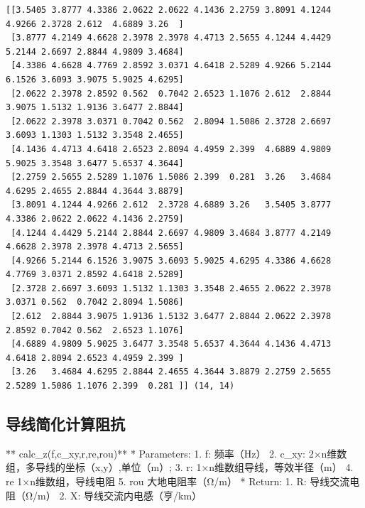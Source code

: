 \documentclass[11pt]{article}
\begin{document}
    \begin{Verbatim}[commandchars=\\\{\}]
[[3.5405 3.8777 4.3386 2.0622 2.0622 4.1436 2.2759 3.8091 4.1244 4.9266 2.3728 2.612  4.6889 3.26  ]
 [3.8777 4.2149 4.6628 2.3978 2.3978 4.4713 2.5655 4.1244 4.4429 5.2144 2.6697 2.8844 4.9809 3.4684]
 [4.3386 4.6628 4.7769 2.8592 3.0371 4.6418 2.5289 4.9266 5.2144 6.1526 3.6093 3.9075 5.9025 4.6295]
 [2.0622 2.3978 2.8592 0.562  0.7042 2.6523 1.1076 2.612  2.8844 3.9075 1.5132 1.9136 3.6477 2.8844]
 [2.0622 2.3978 3.0371 0.7042 0.562  2.8094 1.5086 2.3728 2.6697 3.6093 1.1303 1.5132 3.3548 2.4655]
 [4.1436 4.4713 4.6418 2.6523 2.8094 4.4959 2.399  4.6889 4.9809 5.9025 3.3548 3.6477 5.6537 4.3644]
 [2.2759 2.5655 2.5289 1.1076 1.5086 2.399  0.281  3.26   3.4684 4.6295 2.4655 2.8844 4.3644 3.8879]
 [3.8091 4.1244 4.9266 2.612  2.3728 4.6889 3.26   3.5405 3.8777 4.3386 2.0622 2.0622 4.1436 2.2759]
 [4.1244 4.4429 5.2144 2.8844 2.6697 4.9809 3.4684 3.8777 4.2149 4.6628 2.3978 2.3978 4.4713 2.5655]
 [4.9266 5.2144 6.1526 3.9075 3.6093 5.9025 4.6295 4.3386 4.6628 4.7769 3.0371 2.8592 4.6418 2.5289]
 [2.3728 2.6697 3.6093 1.5132 1.1303 3.3548 2.4655 2.0622 2.3978 3.0371 0.562  0.7042 2.8094 1.5086]
 [2.612  2.8844 3.9075 1.9136 1.5132 3.6477 2.8844 2.0622 2.3978 2.8592 0.7042 0.562  2.6523 1.1076]
 [4.6889 4.9809 5.9025 3.6477 3.3548 5.6537 4.3644 4.1436 4.4713 4.6418 2.8094 2.6523 4.4959 2.399 ]
 [3.26   3.4684 4.6295 2.8844 2.4655 4.3644 3.8879 2.2759 2.5655 2.5289 1.5086 1.1076 2.399  0.281 ]] (14, 14)

    \end{Verbatim}

    \subsection{导线简化计算阻抗}\label{ux5bfcux7ebfux7b80ux5316ux8ba1ux7b97ux963bux6297}

    ** calc\_z(f,c\_xy,r,re,rou)** * Parameters: 1. f: 频率（Hz） 2. c\_xy:
2×n维数组，多导线的坐标（x,y）,单位（m）; 3. r:
1×n维数组导线，等效半径（m） 4. re 1×n维数组，导线电阻 5. rou
大地电阻率（Ω/m） * Return: 1. R: 导线交流电阻（Ω/m） 2. X:
导线交流内电感（亨/km）
\end{document}
